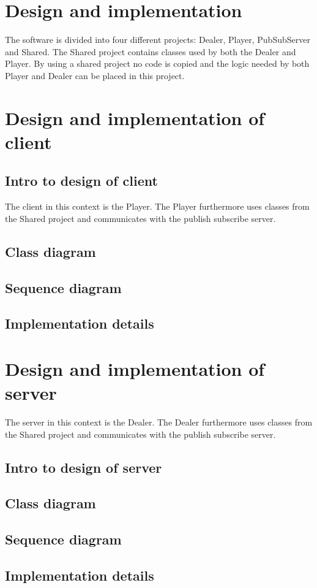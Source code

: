 
\section{Design and implementation}
The software is divided into four different projects: Dealer, Player, PubSubServer and Shared. The Shared project contains classes used by both the Dealer and Player. By using a shared project no code is copied and the logic needed by both Player and Dealer can be placed in this project.

\section{Design and implementation of client}

\subsection{Intro to design of client}
The client in this context is the Player. The Player furthermore uses classes from the Shared project and communicates with the publish subscribe server.

\subsection{Class diagram}

\subsection{Sequence diagram}

\subsection{Implementation details}


\section{Design and implementation of server}
The server in this context is the Dealer. The Dealer furthermore uses classes from the Shared project and communicates with the publish subscribe server.

\subsection{Intro to design of server}

\subsection{Class diagram}

\subsection{Sequence diagram}

\subsection{Implementation details}